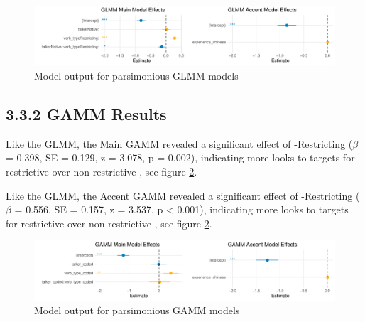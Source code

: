 \begin{figure}[H]
    \centering
    \includegraphics[width=\textwidth]{figures/GLMM_cow_model.pdf}
    \caption{Model output for parsimonious GLMM models}
    \label{fig:GLMM_cow_model}
\end{figure}

\subsection{3.3.2 GAMM Results}

Like the GLMM, the Main GAMM revealed a significant effect of -Restricting ($\beta$ = 0.398, SE = 0.129, z = 3.078, p = 0.002), indicating more looks to targets for restrictive  over non-restrictive , see figure \ref{fig:GAMM_cow_model}.

Like the GLMM, the Accent GAMM revealed a significant effect of -Restricting ($\beta$ = 0.556, SE = 0.157, z = 3.537, p < 0.001), indicating more looks to targets for restrictive  over non-restrictive , see figure \ref{fig:GAMM_cow_model}.

\begin{figure}[H]
    \centering
    \includegraphics[width=\textwidth]{figures/GAMM_cow_model.pdf}
    \caption{Model output for parsimonious GAMM models}
    \label{fig:GAMM_cow_model}
\end{figure}